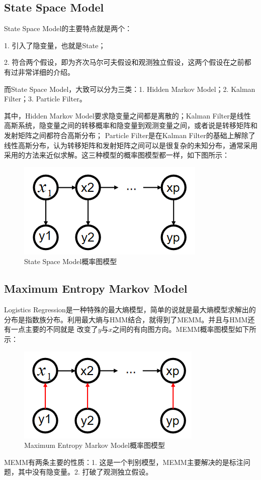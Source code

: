 \documentclass[a4paper]{article}
\begin{document}
\subsection{State Space Model}
State Space Model的主要特点就是两个：

1. 引入了隐变量，也就是State；

2. 符合两个假设，即为齐次马尔可夫假设和观测独立假设，这两个假设在之前都有过非常详细的介绍。

而State Space Model，大致可以分为三类：1. Hidden Markov Model；2. Kalman Filter；3. Particle Filter。

其中，Hidden Markov Model要求隐变量之间都是离散的；Kalman Filter是线性高斯系统，隐变量之间的转移概率和隐变量到观测变量之间，或者说是转移矩阵和发射矩阵之间都符合高斯分布；
Particle Filter是在Kalman Filter的基础上解除了线性高斯分布，认为转移矩阵和发射矩阵之间可以是很复杂的未知分布，通常采用采用的方法来近似求解。这三种模型的概率图模型都一样，如下图所示：
\begin{figure}[H]
    \centering
    \includegraphics[width=.35\textwidth]{微信图片_20200229220207.png}
    \caption{State Space Model概率图模型}
    \label{fig:my_label_1}
\end{figure}

\subsection{Maximum Entropy Markov Model}
Logistics Regression是一种特殊的最大熵模型，简单的说就是最大熵模型求解出的分布是指数族分布。利用最大熵与HMM结合，就得到了MEMM。并且与HMM还有一点主要的不同就是
改变了$y$与$x$之间的有向图方向。MEMM概率图模型如下所示：
\begin{figure}[H]
    \centering
    \includegraphics[width=.35\textwidth]{微信图片_20200229215807.png}
    \caption{Maximum Entropy Markov Model概率图模型}
    \label{fig:my_label_1}
\end{figure}
MEMM有两条主要的性质：1. 这是一个判别模型，MEMM主要解决的是标注问题，其中没有隐变量。2. 打破了观测独立假设。
\end{document}

